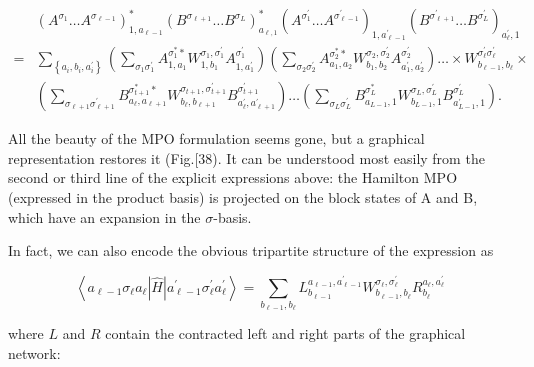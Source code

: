 \documentclass[12pt]{article}
\begin{document}
$$
\begin{aligned}
& \left(A^{\sigma_{1}} \ldots A^{\sigma_{\ell-1}}\right)_{1, a_{\ell-1}}^{*}\left(B^{\sigma_{\ell+1}} \ldots B^{\sigma_{L}}\right)_{a_{\ell, 1}}^{*}\left(A^{\sigma_{1}^{\prime}} \ldots A^{\sigma_{\ell-1}^{\prime}}\right)_{1, a_{\ell-1}^{\prime}}\left(B^{\sigma_{\ell+1}^{\prime}} \ldots B^{\sigma_{L}^{\prime}}\right)_{a_{\ell}^{\prime}, 1} \\
= & \sum_{\left\{a_{i}, b_{i}, a_{i}^{\prime}\right\}}\left(\sum_{\sigma_{1} \sigma_{1}^{\prime}} A_{1, a_{1}}^{\sigma_{1}^{*} *} W_{1, b_{1}}^{\sigma_{1}, \sigma_{1}^{\prime}} A_{1, a_{1}^{\prime}}^{\sigma_{1}^{\prime}}\right)\left(\sum_{\sigma_{2} \sigma_{2}^{\prime}} A_{a_{1}, a_{2}}^{\sigma_{2}^{*} *} W_{b_{1}, b_{2}}^{\sigma_{2}, \sigma_{2}^{\prime}} A_{a_{1}^{\prime}, a_{2}^{\prime}}^{\sigma_{2}^{\prime}}\right) \ldots \times W_{b_{\ell-1}, b_{\ell}}^{\sigma_{\ell}^{\prime} \sigma_{\ell}^{\prime}} \times \\
& \left(\sum_{\sigma_{\ell+1} \sigma_{\ell+1}^{\prime}} B_{a_{\ell}, a_{\ell+1}}^{\sigma_{t+1}^{*} *} W_{b_{\ell}, b_{\ell+1}}^{\sigma_{t+1}, \sigma_{t+1}^{\prime}} B_{a_{\ell}^{\prime}, a_{\ell+1}^{\prime}}^{\sigma_{t+1}^{\prime}}\right) \ldots\left(\sum_{\sigma_{L} \sigma_{L}^{\prime}} B_{a_{L-1}, 1}^{\sigma_{L}^{*}} W_{b_{L-1}, 1}^{\sigma_{L}, \sigma_{L}^{\prime}} B_{a_{L-1}^{\prime}, 1}^{\sigma_{L}^{\prime}}\right) .
\end{aligned}
$$

All the beauty of the MPO formulation seems gone, but a graphical representation restores it (Fig.[38). It can be understood most easily from the second or third line of the explicit expressions above: the Hamilton MPO (expressed in the product basis) is projected on the block states of A and B, which have an expansion in the $\sigma$-basis.

In fact, we can also encode the obvious tripartite structure of the expression as


\begin{equation*}
\left\langle a_{\ell-1} \sigma_{\ell} a_{\ell}|\hat{H}| a_{\ell-1}^{\prime} \sigma_{\ell}^{\prime} a_{\ell}^{\prime}\right\rangle=\sum_{b_{\ell-1}, b_{\ell}} L_{b_{\ell-1}}^{a_{\ell-1}, a_{\ell-1}^{\prime}} W_{b_{\ell-1}, b_{\ell}}^{\sigma_{\ell}, \sigma_{\ell}^{\prime}} R_{b_{\ell}}^{a_{\ell}, a_{\ell}^{\prime}} \tag{191}
\end{equation*}


where $L$ and $R$ contain the contracted left and right parts of the graphical network:
\end{document}
